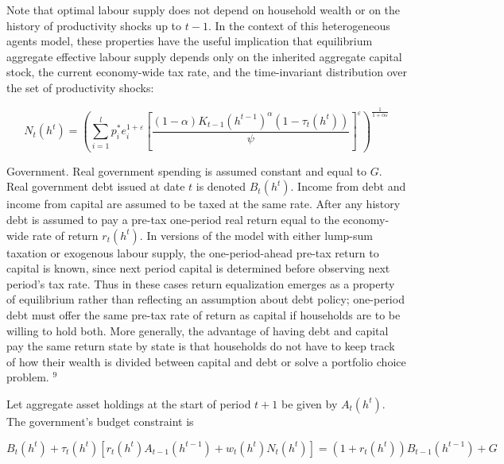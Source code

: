 \documentclass[11pt]{article}
\begin{document}
Note that optimal labour supply does not depend on household wealth or on the history of productivity shocks up to $t-1$. In the context of this heterogeneous agents model, these properties have the useful implication that equilibrium aggregate effective labour supply depends only on the inherited aggregate capital stock, the current economy-wide tax rate, and the time-invariant distribution over the set of productivity shocks:


\begin{equation*}
N_{t}\left(h^{t}\right)=\left(\sum_{i=1}^{l} p_{i}^{*} e_{i}^{1+\varepsilon}\left[\frac{(1-\alpha) K_{t-1}\left(h^{t-1}\right)^{\alpha}\left(1-\tau_{t}\left(h^{t}\right)\right)}{\psi}\right]^{\varepsilon}\right)^{\frac{1}{1+\alpha \varepsilon}} \tag{3.9}
\end{equation*}


Government. Real government spending is assumed constant and equal to $G$. Real government debt issued at date $t$ is denoted $B_{t}\left(h^{t}\right)$. Income from debt and income from capital are assumed to be taxed at the same rate. After any history debt is assumed to pay a pre-tax one-period real return equal to the economy-wide rate of return $r_{t}\left(h^{t}\right)$. In versions of the model with either lump-sum taxation or exogenous labour supply, the one-period-ahead pre-tax return to capital is known, since next period capital is determined before observing next period’s tax rate. Thus in these cases return equalization emerges as a property of equilibrium rather than reflecting an assumption about debt policy; one-period debt must offer the same pre-tax rate of return as capital if households are to be willing to hold both. More generally, the advantage of having debt and capital pay the same return state by state is that households do not have to keep track of how their wealth is divided between capital and debt or solve a portfolio choice problem. ${ }^{9}$

Let aggregate asset holdings at the start of period $t+1$ be given by $A_{t}\left(h^{t}\right)$. The government's budget constraint is


\begin{equation*}
B_{t}\left(h^{t}\right)+\tau_{t}\left(h^{t}\right)\left[r_{t}\left(h^{t}\right) A_{t-1}\left(h^{t-1}\right)+w_{t}\left(h^{t}\right) N_{t}\left(h^{t}\right)\right]=\left(1+r_{t}\left(h^{t}\right)\right) B_{t-1}\left(h^{t-1}\right)+G \tag{3.10}
\end{equation*}
\end{document}
